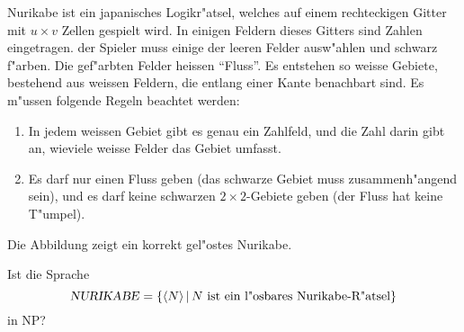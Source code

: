 Nurikabe ist ein japanisches Logikr"atsel, welches auf einem rechteckigen
Gitter mit $u\times v$ Zellen gespielt wird. In einigen Feldern dieses Gitters
sind Zahlen eingetragen.
der Spieler muss einige der leeren Felder ausw"ahlen und schwarz
f"arben. Die gef"arbten Felder heissen ``Fluss''. Es entstehen so
weisse Gebiete, bestehend aus weissen Feldern, die entlang einer Kante
benachbart sind. Es m"ussen folgende Regeln beachtet werden:
\begin{enumerate}
\item In jedem weissen Gebiet gibt es genau ein Zahlfeld, und die Zahl darin
gibt an, wieviele weisse Felder das Gebiet umfasst.
\item Es darf nur einen Fluss geben (das schwarze Gebiet muss zusammenh"angend
sein), und es darf keine schwarzen $2\times 2$-Gebiete geben (der Fluss hat
keine T"umpel).
\end{enumerate}
Die Abbildung zeigt ein korrekt gel"ostes Nurikabe.
\begin{center}
\end{center}
Ist die Sprache
\[
\text{\textsl{NURIKABE}}=\{\langle N\rangle\,|\,\text{$N$ ist ein l"osbares Nurikabe-R"atsel}\}
\]
in NP?

